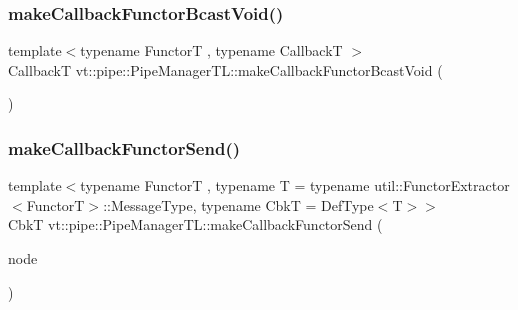 \mbox{\label{structvt_1_1pipe_1_1_pipe_manager_t_l_afc9683e41b08ba2647db78c292717593}} 
\subsubsection{\texorpdfstring{make\+Callback\+Functor\+Bcast\+Void()}{makeCallbackFunctorBcastVoid()}\hspace{0.1cm}{\footnotesize\ttfamily [2/2]}}
{\footnotesize\ttfamily template$<$typename FunctorT , typename CallbackT $>$ \\
CallbackT vt\+::pipe\+::\+Pipe\+Manager\+T\+L\+::make\+Callback\+Functor\+Bcast\+Void (\begin{DoxyParamCaption}{ }\end{DoxyParamCaption})}

\mbox{\label{structvt_1_1pipe_1_1_pipe_manager_t_l_a446f98d0a74d66539a411e1d41caa505}} 
\subsubsection{\texorpdfstring{make\+Callback\+Functor\+Send()}{makeCallbackFunctorSend()}\hspace{0.1cm}{\footnotesize\ttfamily [1/2]}}
{\footnotesize\ttfamily template$<$typename FunctorT , typename T  = typename util\+::\+Functor\+Extractor$<$\+Functor\+T$>$\+::\+Message\+Type, typename CbkT  = Def\+Type$<$\+T$>$$>$ \\
CbkT vt\+::pipe\+::\+Pipe\+Manager\+T\+L\+::make\+Callback\+Functor\+Send (\begin{DoxyParamCaption}\item[{\hyperlink{namespacevt_a866da9d0efc19c0a1ce79e9e492f47e2}{Node\+Type} const \&}]{node }\end{DoxyParamCaption})}

